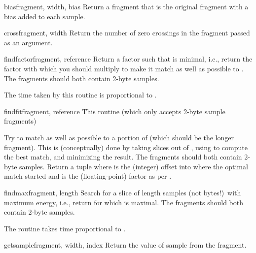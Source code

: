 \begin{funcdesc}{bias}{fragment, width, bias}
Return a fragment that is the original fragment with a bias added to
each sample.
\end{funcdesc}

\begin{funcdesc}{cross}{fragment, width}
Return the number of zero crossings in the fragment passed as an
argument.
\end{funcdesc}

\begin{funcdesc}{findfactor}{fragment, reference}
Return a factor  such that
 is minimal, i.e.,
return the factor with which you should multiply  to
make it match as well as possible to .  The fragments
should both contain 2-byte samples.

The time taken by this routine is proportional to . 
\end{funcdesc}

\begin{funcdesc}{findfit}{fragment, reference}
This routine (which only accepts 2-byte sample fragments)

Try to match  as well as possible to a portion of
 (which should be the longer fragment).  This is
(conceptually) done by taking slices out of , using
 to compute the best match, and minimizing the
result.  The fragments should both contain 2-byte samples.  Return a
tuple  where  is the
(integer) offset into  where the optimal match started
and  is the (floating-point) factor as per
.
\end{funcdesc}

\begin{funcdesc}{findmax}{fragment, length}
Search  for a slice of length  samples (not
bytes!)\ with maximum energy, i.e., return  for which
 is maximal.  The fragments
should both contain 2-byte samples.

The routine takes time proportional to .
\end{funcdesc}

\begin{funcdesc}{getsample}{fragment, width, index}
Return the value of sample  from the fragment.
\end{funcdesc}

